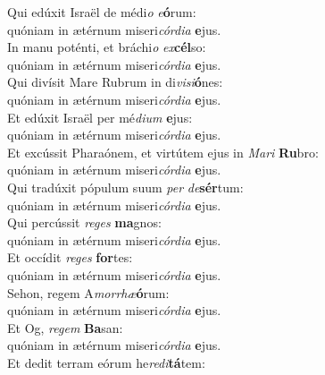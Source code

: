 \evenverse Qui edúxit Israël de médi\textit{o} \textit{e}\textbf{ó}rum:~\*\\
\evenverse quóniam in ætérnum miseri\textit{cór}\textit{di}\textit{a} \textbf{e}jus.\\
\oddverse In manu poténti, et bráchi\textit{o} \textit{ex}\textbf{cél}so:~\*\\
\oddverse quóniam in ætérnum miseri\textit{cór}\textit{di}\textit{a} \textbf{e}jus.\\
\evenverse Qui divísit Mare Rubrum in di\textit{vi}\textit{si}\textbf{ó}nes:~\*\\
\evenverse quóniam in ætérnum miseri\textit{cór}\textit{di}\textit{a} \textbf{e}jus.\\
\oddverse Et edúxit Israël per mé\textit{di}\textit{um} \textbf{e}jus:~\*\\
\oddverse quóniam in ætérnum miseri\textit{cór}\textit{di}\textit{a} \textbf{e}jus.\\
\evenverse Et excússit Pharaónem, et virtútem ejus in \textit{Ma}\textit{ri} \textbf{Ru}bro:~\*\\
\evenverse quóniam in ætérnum miseri\textit{cór}\textit{di}\textit{a} \textbf{e}jus.\\
\oddverse Qui tradúxit pópulum suum \textit{per} \textit{de}\textbf{sér}tum:~\*\\
\oddverse quóniam in ætérnum miseri\textit{cór}\textit{di}\textit{a} \textbf{e}jus.\\
\evenverse Qui percússit \textit{re}\textit{ges} \textbf{ma}gnos:~\*\\
\evenverse quóniam in ætérnum miseri\textit{cór}\textit{di}\textit{a} \textbf{e}jus.\\
\oddverse Et occídit \textit{re}\textit{ges} \textbf{for}tes:~\*\\
\oddverse quóniam in ætérnum miseri\textit{cór}\textit{di}\textit{a} \textbf{e}jus.\\
\evenverse Sehon, regem A\textit{mor}\textit{rhæ}\textbf{ó}rum:~\*\\
\evenverse quóniam in ætérnum miseri\textit{cór}\textit{di}\textit{a} \textbf{e}jus.\\
\oddverse Et Og, \textit{re}\textit{gem} \textbf{Ba}san:~\*\\
\oddverse quóniam in ætérnum miseri\textit{cór}\textit{di}\textit{a} \textbf{e}jus.\\
\evenverse Et dedit terram eórum he\textit{re}\textit{di}\textbf{tá}tem:~\*\\
